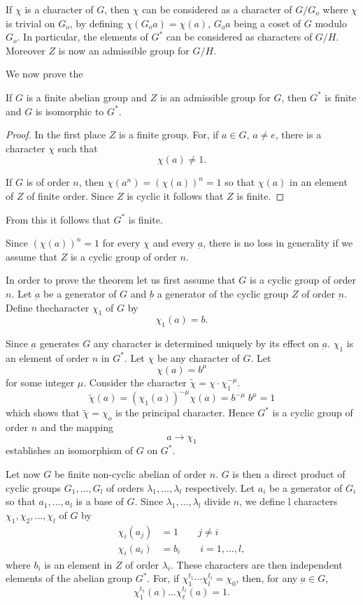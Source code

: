 If $\chi$ is a character of $G$, then $\chi$ can be considered as a
character of $G/G_o$ where $\chi$ is trivial on $G_o$, by defining
$\chi (G_o a) = \chi (a)$, $G_o a$ being a coset of $G$ modulo $G_o$. In
particular, the elements of $G^*$ can be considered as characters of
$G/H$. Moreover $Z$ is now an admissible group for $G/H$. 

We now prove the 

\begin{thm}\label{app:thm3}%
If $G$ is a finite abelian group and $Z$ is an admissible group for
$G$, then $G^*$ is finite and $G$ is isomorphic to $G^*$. 
\end{thm} 

\begin{proof}
In the first place $Z$ is a finite group. For, if $a \in G$, $a \neq e$,
there is a character $\chi$ such that  
$$
\chi (a) \neq 1.
$$

If $G$ is of order $n$, then $\chi (a^n) = (\chi (a))^n = 1$ so that
$\chi (a)$ in an element of $Z$ of finite order. Since $Z$ is cyclic
it follows that $Z$ is finite. 
\end{proof}

From this it follows that $G^*$ is finite.

Since $(\chi (a))^n = 1$ for every $\chi$ and every $\underbar{a}$,
there is no loss in generality if we assume that $Z$ is a cyclic group
of order $n$.  

In order to prove the theorem let us first assume that $G$ is a cyclic
group of order $n$. Let $\underbar{a}$ be a generator of $G$ and
$\underbar{b}$ a generator of the cyclic group $Z$ of order
$\underbar{n}$. Define the\pageoriginale character $\chi_1$ of $G$ by  
$$
\chi_1 (a) = b.
$$

Since $\underbar{a}$ generates $G$ any character is determined uniquely by its
effect on $\underbar{a}$. $\chi_1$ is an element of order $n$ in
$G^*$. Let $\chi$ be any character of $G$. Let 
$$
\chi (a) = b^\mu
$$
for some integer $\mu$. Consider the character $\tilde{\chi} =\chi
\cdot \chi_1^{- \mu}$. 
$$
\tilde{\chi}(a) = (\chi_1(a))^{- \mu} \chi (a) = b^{-\mu} \; b^{\mu} = 1  
$$
which shows that $\tilde{\chi} = \chi_o$ is the principal
character. Hence $G^*$ is a cyclic group of order $n$ and the mapping 
$$
a \to \chi_1 
$$
establishes an isomorphism of $G$ on $G^*$.

Let now $G$ be finite non-cyclic abelian of order $n$. $G$ is then a
direct product of cyclic groups $G_1 , \ldots , G_l$ of orders
$\lambda_1 , \ldots, \lambda_l$ respectively. Let $a_i$ be a generator
of $G_i$ so that $a_1 ,\ldots , a_l$ is a base of $G$. Since
$\lambda_1 ,\ldots , \lambda_l$ divide $n$, we define l characters
$\chi_1, \chi_2 ,\ldots, \chi_l$ of $G$ by    
\begin{align*}
\chi_i (a_j) & = 1 \qquad j \neq i \\
\chi_i (a_i) & = b_i  \qquad i = 1 ,\ldots , l,
\end{align*}
where $b_i$ is an element in $Z$ of order $\lambda_i$. These
characters are then independent elements of the abelian group
$G^*$. For, if $\chi^{t_1}_1 \cdots \chi_l^{t_l} = \chi_0$, then, for
any $\underbar{a} \in G$,  
$$
\chi_1 ^{t_1}(a) \ldots \chi_\ell^{t_l} (a) =1.
$$

